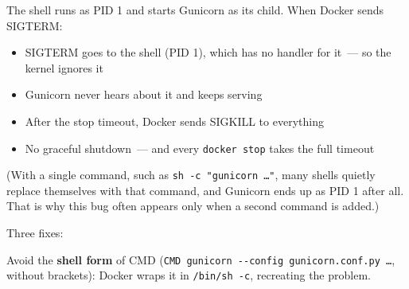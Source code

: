 \noindent{}The shell runs as PID 1 and starts Gunicorn as its child. When Docker sends SIGTERM:

\begin{itemize}
\tightlist
\item
  SIGTERM goes to the shell (PID 1), which has no handler for it~--- so the kernel ignores it
\item
  Gunicorn never hears about it and keeps serving
\item
  After the stop timeout, Docker sends SIGKILL to everything
\item
  No graceful shutdown~--- and every \texttt{docker\ stop} takes the full timeout
\end{itemize}

\noindent{}(With a single command, such as \texttt{sh\ -c\ "gunicorn\ …"}, many shells quietly replace themselves with that command, and Gunicorn ends up as PID 1 after all. That is why this bug often appears only when a second command is added.)

Three fixes:

\begin{codebox}[short]

\begin{Shaded}
\begin{Highlighting}[]
\NormalTok{ [}\NormalTok{, }\NormalTok{, }\NormalTok{, }\NormalTok{]}

\NormalTok{ [}\NormalTok{, }\NormalTok{, }\NormalTok{]}

\end{Highlighting}
\end{Shaded}

\end{codebox}

\noindent{}Avoid the \textbf{shell form} of CMD (\texttt{CMD\ gunicorn\ -}\allowbreak{}\texttt{-}\allowbreak{}\texttt{config\ gunicorn.}\allowbreak{}\texttt{conf.}\allowbreak{}\texttt{py\ …}, without brackets): Docker wraps it in \texttt{/bin/sh\ -c}, recreating the problem.

